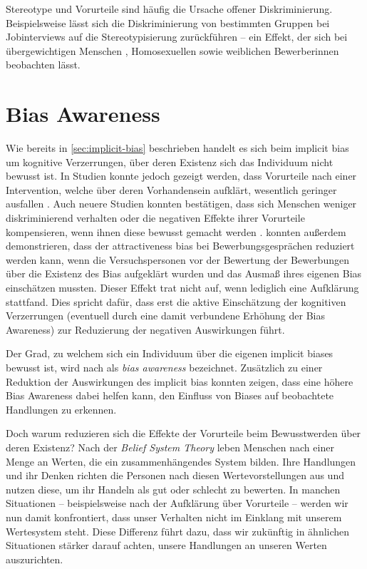 Stereotype und Vorurteile sind häufig die Ursache offener Diskriminierung.
Beispielsweise lässt sich die Diskriminierung von bestimmten Gruppen bei Jobinterviews auf die Stereotypisierung zurückführen -- ein Effekt, der sich bei übergewichtigen Menschen \citep{agerstrom2011role}, Homosexuellen \citep{tilcsik2011pride} sowie weiblichen Bewerberinnen \citep{picho2013exploring, latu2015gender} beobachten lässt.


\section{Bias Awareness}
\label{sec:bias-awareness}

Wie bereits in \autoref{sec:implicit-bias} beschrieben handelt es sich beim implicit bias um kognitive Verzerrungen, über deren Existenz sich das Individuum nicht bewusst ist.
In Studien konnte jedoch gezeigt werden, dass Vorurteile nach einer Intervention, welche über deren Vorhandensein aufklärt, wesentlich geringer ausfallen \citep{penner1970interpersonal, grube1994inducing}.
Auch neuere Studien konnten bestätigen, dass sich Menschen weniger diskriminierend verhalten oder die negativen Effekte ihrer Vorurteile kompensieren, wenn ihnen diese bewusst gemacht werden \citep{monteith1993self, monteith2010aself, monteith2010bself, pope2018awareness}.
 konnten außerdem demonstrieren, dass der attractiveness bias bei Bewerbungsgesprächen reduziert werden kann, wenn die Versuchspersonen vor der Bewertung der Bewerbungen über die Existenz des Bias aufgeklärt wurden und das Ausmaß ihres eigenen Bias einschätzen mussten.
Dieser Effekt trat nicht auf, wenn lediglich eine Aufklärung stattfand.
Dies spricht dafür, dass erst die aktive Einschätzung der kognitiven Verzerrungen (eventuell durch eine damit verbundene Erhöhung der Bias Awareness) zur Reduzierung der negativen Auswirkungen führt.

Der Grad, zu welchem sich ein Individuum über die eigenen implicit biases bewusst ist, wird nach \citet{perry2015modern} als \emph{bias awareness} bezeichnet.
Zusätzlich zu einer Reduktion der Auswirkungen des implicit bias konnten  zeigen, dass eine höhere Bias Awareness dabei helfen kann, den Einfluss von Biases auf beobachtete Handlungen zu erkennen.

Doch warum reduzieren sich die Effekte der Vorurteile beim Bewusstwerden über deren Existenz?
Nach der \emph{Belief System Theory} \citep{rokeach1968theory, grube1994inducing} leben Menschen nach einer Menge an Werten, die ein zusammenhängendes System bilden.
Ihre Handlungen und ihr Denken richten die Personen nach diesen Wertevorstellungen aus und nutzen diese, um ihr Handeln als gut oder schlecht zu bewerten.
In manchen Situationen -- beispielsweise nach der Aufklärung über Vorurteile -- werden wir nun damit konfrontiert, dass unser Verhalten nicht im Einklang mit unserem Wertesystem steht.
Diese Differenz führt dazu, dass wir zukünftig in ähnlichen Situationen stärker darauf achten, unsere Handlungen an unseren Werten auszurichten.

